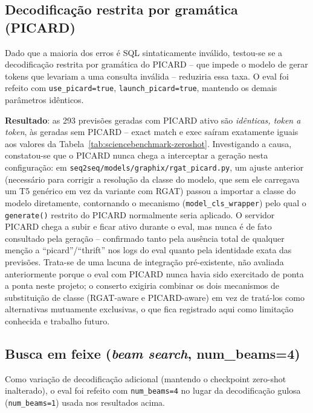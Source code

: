 \subsection{Decodificação restrita por gramática (PICARD)}
\label{sec:picard-attempt}

Dado que a maioria dos erros é SQL sintaticamente inválido, testou-se se a
decodificação restrita por gramática do PICARD \cite{picard2021}
-- que impede o modelo de gerar tokens que levariam a uma consulta
inválida -- reduziria essa taxa. O eval foi refeito com
\texttt{use\_picard=true}, \texttt{launch\_picard=true}, mantendo os demais
parâmetros idênticos.

\textbf{Resultado}: as 293 previsões geradas com PICARD ativo são
\emph{idênticas, token a token}, às geradas sem PICARD -- exact match e exec
saíram exatamente iguais aos valores da Tabela~\ref{tab:sciencebenchmark-zeroshot}.
Investigando a causa, constatou-se que o PICARD nunca chega a interceptar a
geração nesta configuração: em \texttt{seq2seq/models/graphix/rgat\_picard.py},
um ajuste anterior (necessário para corrigir a resolução da classe do modelo,
que sem ele carregava um T5 genérico em vez da variante com RGAT) passou a
importar a classe do modelo diretamente, contornando o mecanismo
(\texttt{model\_cls\_wrapper}) pelo qual o \texttt{generate()} restrito do
PICARD normalmente seria aplicado. O servidor PICARD chega a subir e ficar
ativo durante o eval, mas nunca é de fato consultado pela geração --
confirmado tanto pela ausência total de qualquer menção a
``picard''/``thrift'' nos logs do eval quanto pela identidade exata das
previsões. Trata-se de uma lacuna de integração pré-existente, não avaliada
anteriormente porque o eval com PICARD nunca havia sido exercitado de ponta
a ponta neste projeto; o conserto exigiria combinar os dois mecanismos de
substituição de classe (RGAT-aware e PICARD-aware) em vez de tratá-los como
alternativas mutuamente exclusivas, o que fica registrado aqui como limitação
conhecida e trabalho futuro.

\subsection{Busca em feixe (\emph{beam search}, num\_beams=4)}
\label{sec:beam4}

Como variação de decodificação adicional (mantendo o checkpoint zero-shot
inalterado), o eval foi refeito com \texttt{num\_beams=4} no lugar da
decodificação gulosa (\texttt{num\_beams=1}) usada nos resultados acima.

